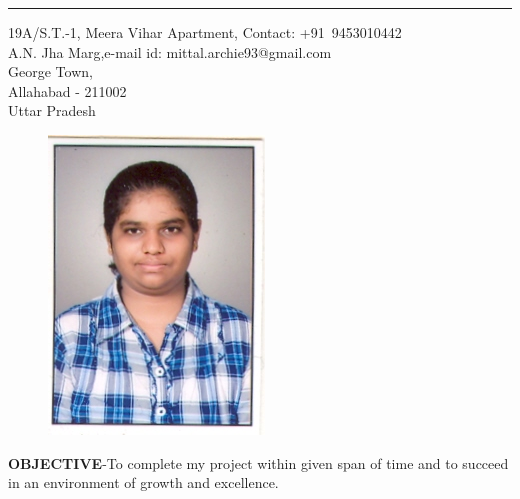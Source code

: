 \documentclass{article}
\begin{document}
	\begin{center}
		\huge{
			\rule[4mm]{\textwidth}{0.5mm}}
	\end{center}
	19A/S.T.-1, Meera Vihar Apartment, \hspace{4.22cm} Contact: \mbox{+91 9453010442}\\
	A.N. Jha Marg,\hfill e-mail id: mittal.archie93@gmail.com\\
	George Town,\\
	Allahabad - 211002\\
	Uttar Pradesh\\
	\begin{figure}[h]
		\hspace{10.1cm}
		\includegraphics[scale=0.25]{Archie_Mittal.jpg}\\
	\end{figure}
	\textbf{OBJECTIVE}-To complete my project within given span of time and to succeed in an environment of growth and excellence.\\[\baselineskip]
\end{document}
